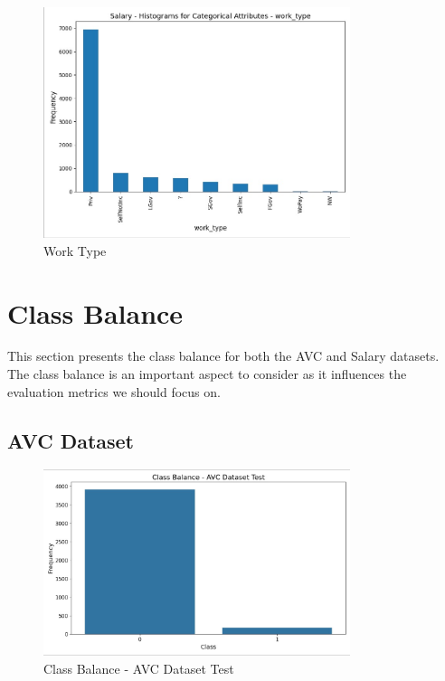 \documentclass[a4paper,12pt]{article}
\begin{document}
\begin{figure}[H]
    \centering
    \includegraphics[width=0.8\textwidth]{Resources/histogram_work_type.jpeg}
    \caption{Work Type}
\end{figure}

\newpage

\section{Class Balance}
This section presents the class balance for both the AVC and Salary datasets. The class balance is an important aspect to consider as it influences the evaluation metrics we should focus on.

\subsection{AVC Dataset}
\begin{figure}[h!]
    \centering
    \includegraphics[width=0.8\textwidth]{Resources/class_balance_avc_test.jpeg}
    \caption{Class Balance - AVC Dataset Test}
\end{figure}
\end{document}
